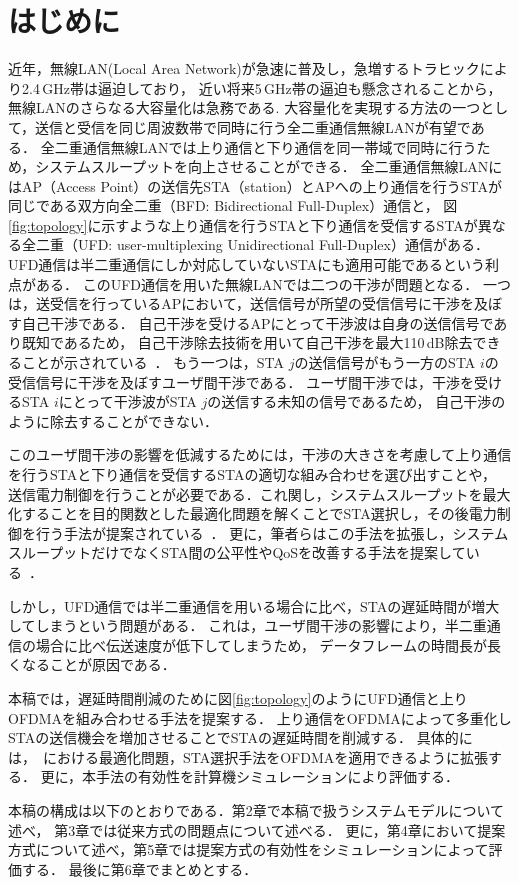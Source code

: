 \documentclass[technicalreport]{ieicej}
\begin{document}
\maketitle

\section{はじめに}
	近年，無線LAN(Local Area Network)が急速に普及し，急増するトラヒックにより2.4\,GHz帯は逼迫しており，
	近い将来5\,GHz帯の逼迫も懸念されることから，無線LANのさらなる大容量化は急務である.
	大容量化を実現する方法の一つとして，送信と受信を同じ周波数帯で同時に行う全二重通信無線LANが有望である．
	全二重通信無線LANでは上り通信と下り通信を同一帯域で同時に行うため，システムスループットを向上させることができる．
	全二重通信無線LANにはAP（Access Point）の送信先STA（station）とAPへの上り通信を行うSTAが同じである双方向全二重（BFD: Bidirectional Full-Duplex）通信と，
	図\ref{fig:topology}に示すような上り通信を行うSTAと下り通信を受信するSTAが異なる全二重（UFD: user-multiplexing Unidirectional Full-Duplex）通信がある．
	UFD通信は半二重通信にしか対応していないSTAにも適用可能であるという利点がある．
	このUFD通信を用いた無線LANでは二つの干渉が問題となる．
	一つは，送受信を行っているAPにおいて，送信信号が所望の受信信号に干渉を及ぼす自己干渉である．
	自己干渉を受けるAPにとって干渉波は自身の送信信号であり既知であるため，
	自己干渉除去技術を用いて自己干渉を最大110\,dB除去できることが示されている~\cite{fdmac, stanford1}．
	もう一つは，STA $j$の送信信号がもう一方のSTA $i$の受信信号に干渉を及ぼすユーザ間干渉である．
	ユーザ間干渉では，干渉を受けるSTA $i$にとって干渉波がSTA $j$の送信する未知の信号であるため，
	自己干渉のように除去することができない．
	\par
	このユーザ間干渉の影響を低減するためには，干渉の大きさを考慮して上り通信を行うSTAと下り通信を受信するSTAの適切な組み合わせを選び出すことや，
	送信電力制御を行うことが必要である．これ関し，システムスループットを最大化することを目的関数とした最適化問題を解くことでSTA選択し，その後電力制御を行う手法が提案されている~\cite{promac}．
	更に，筆者らはこの手法を拡張し，システムスループットだけでなくSTA間の公平性やQoSを改善する手法を提案している~\cite{promac_fair}．
	\par
	しかし，UFD通信では半二重通信を用いる場合に比べ，STAの遅延時間が増大してしまうという問題がある．
	これは，ユーザ間干渉の影響により，半二重通信の場合に比べ伝送速度が低下してしまうため，
	データフレームの時間長が長くなることが原因である．
	\par
	本稿では，遅延時間削減のために図\ref{fig:topology}のようにUFD通信と上りOFDMAを組み合わせる手法を提案する．
	上り通信をOFDMAによって多重化しSTAの送信機会を増加させることでSTAの遅延時間を削減する．
	具体的には，~\cite{promac_fair}における最適化問題，STA選択手法をOFDMAを適用できるように拡張する．
	更に，本手法の有効性を計算機シミュレーションにより評価する．
	\par
	本稿の構成は以下のとおりである．第2章で本稿で扱うシステムモデルについて述べ，
	第3章では従来方式の問題点について述べる．
	更に，第4章において提案方式について述べ，第5章では提案方式の有効性をシミュレーションによって評価する．
	最後に第6章でまとめとする．
\end{document}
